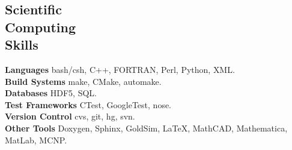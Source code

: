 \documentclass[margin,line]{resume}
\begin{document}
\begin{resume}
    \vspace{5mm}
    \section{\mysidestyle Scientific\\Computing\\Skills}
                \textbf{Languages} \hfill bash/csh, C++, FORTRAN, Perl, Python, XML.\vspace{.5mm}\\%
                \textbf{Build Systems} \hfill make, CMake, automake.\vspace{.5mm}\\%
                \textbf{Databases} \hfill HDF5, SQL.\vspace{.5mm}\\%
                \textbf{Test Frameworks} \hfill CTest, GoogleTest, nose.\vspace{.5mm}\\%
                \textbf{Version Control} \hfill cvs, git, hg, svn.\vspace{.5mm}\\%
                \textbf{Other Tools} \hfill Doxygen, Sphinx, GoldSim, \LaTeX, MathCAD, Mathematica, MatLab, MCNP.\vspace{.5mm}\\%


\end{resume}
\end{document}
